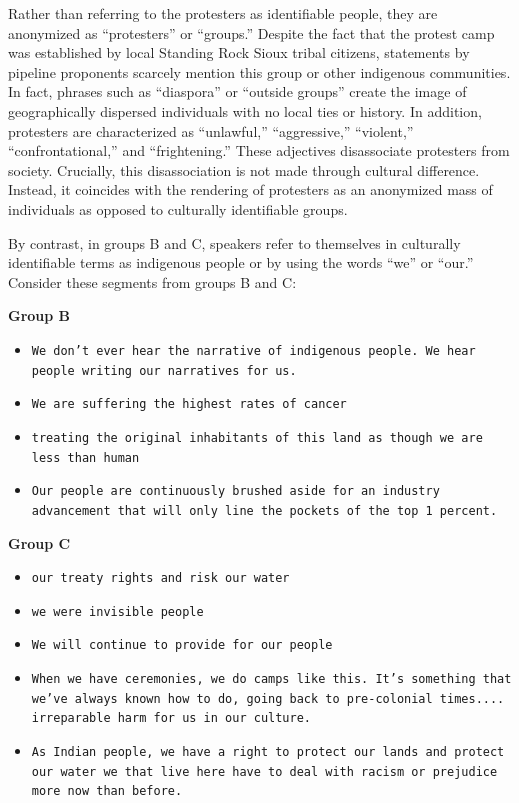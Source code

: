 Rather than referring to the protesters as identifiable people, they are anonymized as ``protesters'' or ``groups.'' Despite the fact that the protest camp was established by local Standing Rock Sioux tribal citizens, statements by pipeline proponents scarcely mention this group or other indigenous communities. In fact, phrases such as ``diaspora'' or ``outside groups'' create the image of geographically dispersed individuals with no local ties or history. In addition, protesters are characterized as ``unlawful,'' ``aggressive,'' ``violent,'' ``confrontational,'' and ``frightening.'' These adjectives disassociate protesters from society. Crucially, this disassociation is not made through cultural difference. Instead, it coincides with the rendering of protesters as an anonymized mass of individuals as opposed to culturally identifiable groups.

By contrast, in groups B and C, speakers refer to themselves in culturally identifiable terms as indigenous people or by using the words ``we'' or ``our.'' Consider these segments from groups B and C: 

\begin{footnotesize}

\textbf{Group B}

\begin{itemize}
\item[-] \texttt{We don't ever hear the narrative of indigenous people.  We hear people writing our narratives for us.}
\item[-] \texttt{We are suffering the highest rates of cancer}
\item[-] \texttt{treating the original inhabitants of this land as though we are less than human}
\item[-] \texttt{Our people are continuously brushed aside for an industry advancement that will only line the pockets of the top 1 percent.}

\end{itemize}
\end{footnotesize}
\begin{footnotesize}
\textbf{Group C}
\begin{itemize}
\item[-] \texttt{our treaty rights and risk our water}
\item[-] \texttt{we were invisible people}
\item[-] \texttt{We will continue to provide for our people}
\item[-] \texttt{When we have ceremonies, we do camps like this. It's something that we've always known how to do, going back to pre-colonial times.... irreparable harm for us in our culture.}
\item[-] \texttt{As Indian people, we have a right to protect our lands and protect our water we that live here have to deal with racism or prejudice more now than before.}
\end{itemize}
\end{footnotesize}

